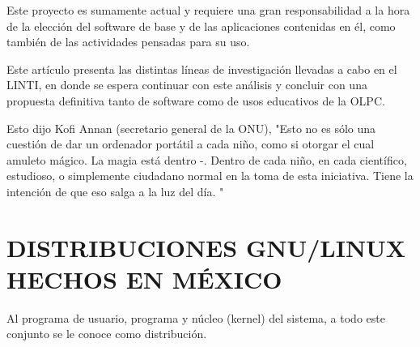 Este proyecto es sumamente actual y requiere una gran
responsabilidad a la hora de la elección del software de base y
de las aplicaciones contenidas en él, como también de las
actividades pensadas para su uso.

Este artículo presenta las distintas líneas de investigación
llevadas a cabo en el LINTI, en donde se espera continuar con
este análisis y concluir con una propuesta definitiva tanto de
software como de usos educativos de la OLPC.

Esto dijo Kofi Annan (secretario general de la ONU), "Esto no es
sólo una cuestión de dar un ordenador portátil a cada niño,
como si otorgar el cual amuleto mágico. La magia está dentro -.
Dentro de cada niño, en cada científico, estudioso, o
simplemente ciudadano normal en la toma de esta iniciativa.
Tiene la intención de que eso salga a la luz del día. "
   
\section*{DISTRIBUCIONES GNU/LINUX HECHOS EN MÉXICO}
Al programa de usuario, programa y núcleo (kernel) del sistema,
a todo este conjunto se le conoce como distribución.
